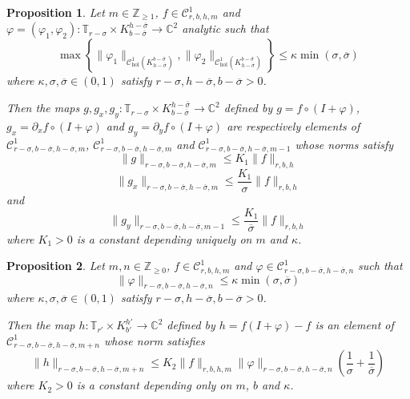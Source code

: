 \documentclass[10pt,a4paper]{amsart}
\newtheorem{proposition}{Proposition}
\newcommand{\C}{\mathbb{C}}
\newcommand{\T}{\mathbb{T}}
\newcommand{\Z}{\mathbb{Z}}
\begin{document}
\begin{proposition}
\label{proposition:composition_estimates}
Let $m\in\Z_{\geq 1}$, $f\in\mathscr C^1_{r,b,h,m}$ and $\varphi=(\varphi_1,\varphi_2):\T_{r-\sigma}\times K_{b-\overline\sigma}^{h-\overline\sigma}\to\C^2$ analytic such that 
\begin{equation}
\label{eq:size_compo}
\max\left\{\|\varphi_1\|_{\mathscr C_{\text{hol}}^1(K_{h-\overline\sigma}^{b-\overline\sigma})}, \|\varphi_2\|_{\mathscr C_{\text{hol}}^1(K_{h-\overline\sigma}^{b-\overline\sigma})} 
\right\}
\leq \kappa\min(\sigma,\overline\sigma)
\end{equation}
where $\kappa,\sigma,\overline\sigma\in(0,1)$ satisfy $r-\sigma,h-\overline\sigma,b-\overline\sigma>0$. 

Then the maps $g,g_x,g_y:\T_{r-\sigma}\times K_{b-\overline\sigma}^{h-\overline\sigma}\to \C^2$ defined by $g=f\circ(I+\varphi)$, $g_x=\partial_xf\circ(I+\varphi)$ and $g_y=\partial_yf\circ(I+\varphi)$ are respectively elements of $\mathscr C^1_{r-\sigma,b-\overline\sigma,h-\overline\sigma,m}$, $\mathscr C^1_{r-\sigma,b-\overline\sigma,h-\overline\sigma,m}$ and $\mathscr C^1_{r-\sigma,b-\overline\sigma,h-\overline\sigma,m-1}$ whose norms satisfy
\begin{equation}
 \label{equation:inequality_composition}
 \|g\|_{r-\sigma,b-\overline\sigma,h-\overline\sigma,m} \leq K_1\|f\|_{r,b,h}
\end{equation}
\[
\|g_x\|_{r-\sigma,b-\overline\sigma,h-\overline\sigma,m}\leq \frac{K_1}{\sigma}\|f\|_{r,b,h}
\]
and
\[
\|g_y\|_{r-\sigma,b-\overline\sigma,h-\overline\sigma,m-1}\leq \frac{K_1}{\overline\sigma}\|f\|_{r,b,h}
\]
where $K_1>0$ is a constant depending uniquely on $m$ and $\kappa$.
\end{proposition}

\begin{proposition}
\label{proposition:difference_estimates}
Let $m,n\in\Z_{\geq0}$, $f\in\mathscr C^1_{r,b,h,m}$ and $\varphi\in\mathscr C^1_{r-\sigma,b-\overline\sigma,h-\overline\sigma,n}$ such that 
\begin{equation}
\label{eq:size_compo_2}
\|\varphi\|_{r-\sigma,b-\overline\sigma,h-\overline\sigma,n} \leq \kappa\min(\sigma,\overline\sigma)
\end{equation}
where $\kappa,\sigma,\overline\sigma\in(0,1)$ satisfy $r-\sigma,h-\overline\sigma,b-\overline\sigma>0$.  

Then the map $h:\T_{r'}\times K_{b'}^{h'}\to \C^2$ defined by
$h=f(I+\varphi)-f$ is an element of $\mathscr C^1_{r-\sigma,b-\overline\sigma,h-\overline\sigma,m+n}$ whose norm satisfies
$$\|h\|_{r-\sigma,b-\overline\sigma,h-\overline\sigma,m+n}\leq K_2\|f\|_{r,b,h,m}\|\varphi\|_{r-\sigma,b-\overline\sigma,h-\overline\sigma,n}\left(
\frac{1}{\sigma}
+\frac{1}{\overline\sigma}\right)$$
where $K_2>0$ is a constant depending only on $m$, $b$ and $\kappa$.
\end{proposition}
\end{document}
